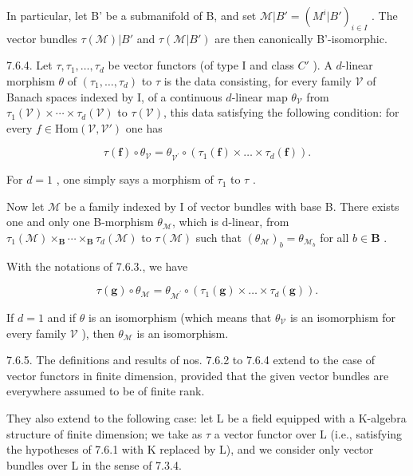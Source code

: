 In particular, let B' be a submanifold of B, and set \(\mathcal{M}|B' = (M^{i}|B')_{i\in I}\) . The vector bundles \(\tau(\mathcal{M})|B'\) and \(\tau(\mathcal{M}|B')\) are then canonically B'-isomorphic.

7.6.4. Let \(\tau, \tau_1, \ldots, \tau_d\) be vector functors (of type I and class \(C'\) ). A \(d\)-linear morphism \(\theta\) of \((\tau_1, \ldots, \tau_d)\) to \(\tau\) is the data consisting, for every family \(\mathcal{V}\) of Banach spaces indexed by I, of a continuous \(d\)-linear map \(\theta_{\mathcal{V}}\) from \(\tau_1(\mathcal{V}) \times \cdots \times \tau_d(\mathcal{V})\) to \(\tau(\mathcal{V})\), this data satisfying the following condition: for every \(f \in \text{Hom}(\mathcal{V}, \mathcal{V}')\) one has

\[
\tau (\mathbf {f}) \circ \theta_ {\mathcal{V}} = \theta_ {\mathcal{V}^{\prime}} \circ (\tau_ {1} (\mathbf {f}) \times \dots \times \tau _{d} (\mathbf {f})).
\]

For \(d = 1\) , one simply says a morphism of \(\tau_1\) to \(\tau\) .

Now let \(\mathcal{M}\) be a family indexed by I of vector bundles with base B. There exists one and only one B-morphism \(\theta_{\mathcal{M}}\), which is d-linear, from \(\tau_{1}(\mathcal{M}) \times_{\mathbf{B}} \cdots \times_{\mathbf{B}} \tau_{d}(\mathcal{M})\) to \(\tau(\mathcal{M})\) such that \((\theta_{\mathcal{M}})_{b} = \theta_{\mathcal{M}_{b}}\) for all \(b \in \mathbf{B}\) .

With the notations of 7.6.3., we have

\[
\tau (\mathbf {g}) \circ \theta_ {\mathcal {M}} = \theta_ {\mathcal {M} ^ {\prime}} \circ (\tau_ {1} (\mathbf {g}) \times \dots \times \tau_ {d} (\mathbf {g})).
\]

If \(d=1\) and if \(\theta\) is an isomorphism (which means that \(\theta_{\mathcal{V}}\) is an isomorphism for every family \(\mathcal{V}\) ), then \(\theta_{\mathcal{M}}\) is an isomorphism.

7.6.5. The definitions and results of nos. 7.6.2 to 7.6.4 extend to the case of vector functors in finite dimension, provided that the given vector bundles are everywhere assumed to be of finite rank.

They also extend to the following case: let L be a field equipped with a K-algebra structure of finite dimension; we take as \(\tau\) a vector functor over L (i.e., satisfying the hypotheses of 7.6.1 with K replaced by L), and we consider only vector bundles over L in the sense of 7.3.4.

